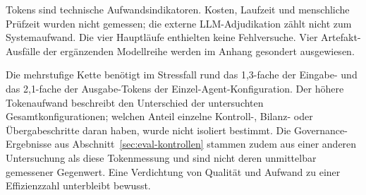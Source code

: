 Tokens sind technische Aufwandsindikatoren. Kosten, Laufzeit und
menschliche Prüfzeit wurden nicht gemessen; die externe
LLM-Adjudikation zählt nicht zum Systemaufwand. Die vier Hauptläufe
enthielten keine Fehlversuche. Vier Artefakt-Ausfälle der ergänzenden
Modellreihe werden im Anhang gesondert ausgewiesen.



Die mehrstufige Kette benötigt im Stressfall rund das 1{,}3-fache
der Eingabe- und das 2{,}1-fache der Ausgabe-Tokens der
Einzel-Agent-Konfiguration. Der höhere Tokenaufwand beschreibt
den Unterschied der untersuchten Gesamtkonfigurationen; welchen
Anteil einzelne Kontroll-, Bilanz- oder Übergabeschritte daran
haben, wurde nicht isoliert bestimmt. Die Governance-Ergebnisse
aus Abschnitt~\ref{sec:eval-kontrollen} stammen zudem aus einer anderen Untersuchung
als diese Tokenmessung und sind nicht deren unmittelbar
gemessener Gegenwert. Eine Verdichtung von Qualität und Aufwand
zu einer Effizienzzahl unterbleibt bewusst.
